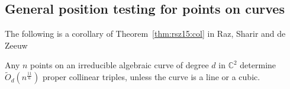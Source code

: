 \subsection{General position testing for points on curves}


The following is a corollary of Theorem~\ref{thm:rsz15:col} in Raz, Sharir and de Zeeuw~\cite{RSZ15}
\begin{corollary}
	Any $n$ points on an irreducible algebraic curve of degree $d$ in
	$\mathbb{C}^2$ determine
	$\tilde{O}_d(n^{\frac{11}{6}})$ proper collinear triples, unless the curve is a line or a cubic.
\end{corollary}

